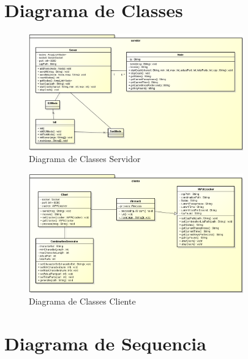 \documentclass[12pt,a4paper]{abnt}
\begin{document}
		\clearpage
		\section{Diagrama de Classes}

			\begin{figure}[htp]
				\begin{center}
				  \includegraphics[width=350px]{diagramaClassesServidor}
				  \caption[Diagrama de Classes Servidor]{Diagrama de Classes Servidor}
				  \label{fig:diagramaClassesServidor}
				\end{center}
			\end{figure}
			\FloatBarrier

			\begin{figure}[htp]
				\begin{center}
				  \includegraphics[width=350px]{DiagramaClassesCliente}
				  \caption[Diagrama de Classes Cliente]{Diagrama de Classes Cliente}
				  \label{fig:diagramaClassesCliente}
				\end{center}
			\end{figure}
			\FloatBarrier

		\section{Diagrama de Sequencia}
		
\end{document}
